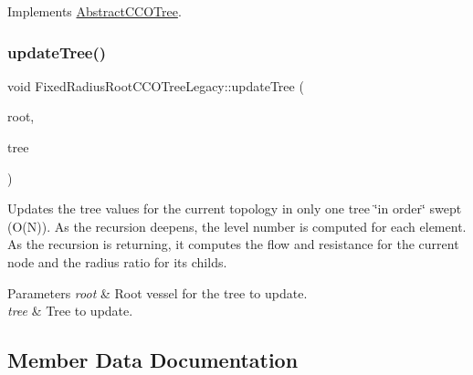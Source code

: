 Implements \mbox{\hyperlink{class_abstract_c_c_o_tree}{Abstract\+C\+C\+O\+Tree}}.

\mbox{\label{class_fixed_radius_root_c_c_o_tree_legacy_a52b3973fad2b0905b6848fd3f7c55221}} 
\subsubsection{\texorpdfstring{update\+Tree()}{updateTree()}}
{\footnotesize\ttfamily void Fixed\+Radius\+Root\+C\+C\+O\+Tree\+Legacy\+::update\+Tree (\begin{DoxyParamCaption}\item[{\mbox{\hyperlink{structvessel}{vessel}} $\ast$}]{root,  }\item[{\mbox{\hyperlink{class_fixed_radius_root_c_c_o_tree_legacy}{Fixed\+Radius\+Root\+C\+C\+O\+Tree\+Legacy}} $\ast$}]{tree }\end{DoxyParamCaption})\hspace{0.3cm}{\ttfamily [private]}}

Updates the tree values for the current topology in only one tree \char`\"{}in order\char`\"{} swept (O(\+N)). As the recursion deepens, the level number is computed for each element. As the recursion is returning, it computes the flow and resistance for the current node and the radius ratio for its childs. 
\begin{DoxyParams}{Parameters}
{\em root} & Root vessel for the tree to update. \\
\hline
{\em tree} & Tree to update. \\
\hline
\end{DoxyParams}


\subsection{Member Data Documentation}
\mbox{\label{class_fixed_radius_root_c_c_o_tree_legacy_a21b54a45c92fe9c86a3a566966127048}} 
